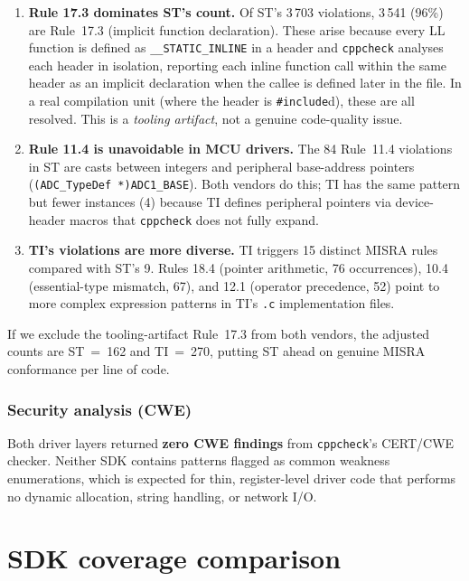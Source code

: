 \begin{enumerate}
  \item \textbf{Rule 17.3 dominates ST's count.} Of ST's 3\,703 violations, 3\,541 (96\%)
        are Rule~17.3 (implicit function declaration). These arise because every LL
        function is defined as \texttt{\_\_STATIC\_INLINE} in a header and \texttt{cppcheck}
        analyses each header in isolation, reporting each inline function call within the
        same header as an implicit declaration when the callee is defined later in the file.
        In a real compilation unit (where the header is \texttt{\#include}d), these are all
        resolved. This is a \emph{tooling artifact}, not a genuine code-quality issue.

  \item \textbf{Rule 11.4 is unavoidable in MCU drivers.} The 84 Rule~11.4 violations in ST
        are casts between integers and peripheral base-address pointers
        (\texttt{(ADC\_TypeDef~*)ADC1\_BASE}). Both vendors do this; TI has the same
        pattern but fewer instances (4) because TI defines peripheral pointers via
        device-header macros that \texttt{cppcheck} does not fully expand.

  \item \textbf{TI's violations are more diverse.} TI triggers 15 distinct MISRA rules
        compared with ST's 9. Rules 18.4 (pointer arithmetic, 76 occurrences), 10.4
        (essential-type mismatch, 67), and 12.1 (operator precedence, 52) point to more
        complex expression patterns in TI's \texttt{.c} implementation files.
\end{enumerate}

\noindent
If we exclude the tooling-artifact Rule~17.3 from both vendors, the adjusted counts are
ST~=~162 and TI~=~270, putting ST ahead on genuine MISRA conformance per line of code.

\subsubsection*{Security analysis (CWE)}
Both driver layers returned \textbf{zero CWE findings} from \texttt{cppcheck}'s CERT/CWE
checker. Neither SDK contains patterns flagged as common weakness enumerations, which is
expected for thin, register-level driver code that performs no dynamic allocation, string
handling, or network I/O.

\section{SDK coverage comparison}
\label{sec:ti-sdk-coverage}

